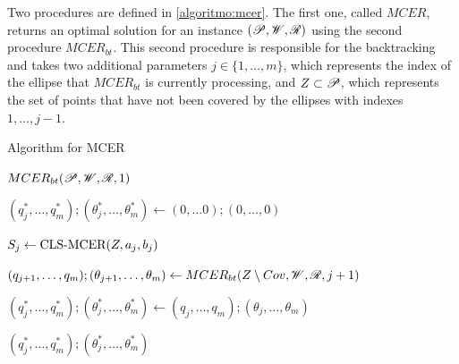 Two procedures are defined in \autoref{algoritmo:mcer}. The first one, called $MCER$, returns an optimal solution for an instance $(\mathscr{P}, \mathscr{W}, \mathscr{R})$ using the second procedure $MCER_{bt}$. This second procedure is responsible for the backtracking and takes two additional parameters $j\in\{1, \dots, m\}$, which represents the index of the ellipse that $MCER_{bt}$ is currently processing, and $Z\subset \mathscr{P}$, which represents the set of points that have not been covered by the ellipses with indexes $1, \dots, j-1$.


\begin{algoritmo}
	\caption{Algorithm for MCER}\label{algoritmo:mcer}
	\begin{algorithmic}[1]
		
		
		\item[]
		\State \Return $MCER_{bt}(\mathscr{P}, \mathscr{W}, \mathscr{R}, 1)$
		\EndProcedure
		
		\item[]
		
		
		\State $(q_{j}^*, \dots, q_m^*); (\theta_{j}^*, \dots, \theta_m^*) \gets (0, \dots 0); (0, \dots, 0)$ 
		
		\State $S_j \gets \textnormal{CLS-MCER}(Z, a_j, b_j)$

		
		
		\State $(q_{j+1}, \dots, q_m); (\theta_{j+1}, \dots, \theta_m) \gets  MCER_{bt}(Z\setminus Cov, \mathscr{W}, \mathscr{R}, j+1)$
		\EndIf
		
			
			\State $(q_{j}^*, \dots, q_m^*); (\theta_{j}^*, \dots, \theta_m^*) \gets (q_{j}, \dots, q_m); (\theta_{j}, \dots, \theta_m)$
		\EndIf
		\EndFor
		
		\State \Return $(q_{j}^*, \dots, q_m^*); (\theta_{j}^*, \dots, \theta_m^*)$
		\EndProcedure
	\end{algorithmic}
\end{algoritmo}

